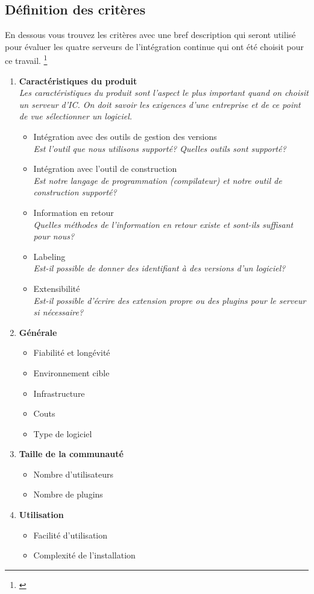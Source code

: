 \subsection{Définition des critères}

En dessous vous trouvez les critères avec une bref description qui seront utilisé pour évaluer les quatre serveurs de l'intégration continue qui ont été choisit pour ce travail. \footnote{\cite{ibmciserver}}

\begin{enumerate}
\item \textbf{Caractéristiques du produit} \\
\textit{Les caractéristiques du produit sont l'aspect le plus important quand on choisit un serveur d'IC. On doit savoir les exigences d'une entreprise et de ce point de vue sélectionner un logiciel.}
	\begin{itemize}
		\item Intégration avec des outils de gestion des versions \\
		\textit{Est l'outil que nous utilisons supporté? Quelles outils sont supporté?}
		\item Intégration avec l'outil de construction \\
		\textit{Est notre langage de programmation (compilateur) et notre outil de construction supporté?}
		\item Information en retour \\
		\textit{Quelles méthodes de l'information en retour existe et sont-ils suffisant pour nous?}
		\item Labeling \\
		\textit{Est-il possible de donner des identifiant à des versions d'un logiciel?}
		\item Extensibilité \\
		\textit{Est-il possible d'écrire des extension propre ou des plugins pour le serveur si nécessaire?}
	\end{itemize}
\item \textbf{Générale}
	\begin{itemize}
		\item Fiabilité et longévité
		\item Environnement cible
		\item Infrastructure
		\item Couts
		\item Type de logiciel
	\end{itemize}
\item \textbf{Taille de la communauté}
	\begin{itemize}
		\item Nombre d'utilisateurs
		\item Nombre de plugins
	\end{itemize}
\item \textbf{Utilisation}
	\begin{itemize}
		\item Facilité d'utilisation
		\item Complexité de l'installation
	\end{itemize}
\end{enumerate}
